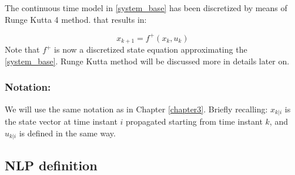 The continuous time model in \ref{system_base} has been discretized by means of Runge Kutta 4 method. that results in: 

\begin{equation*} \label{system_base_d}
	{x}_{k+1}=f^+(x_k,u_k)
\end{equation*}
Note that $f^+$ is now a discretized state equation approximating the \ref{system_base}. Runge Kutta method will be discussed more in details later on.

\subsubsection*{Notation:}
We will use the same notation as in Chapter \ref{chapter3}. Briefly recalling: ${x}_{k|i}$ is the state vector at time instant $i$ propagated starting from time instant $k$, and ${u}_{k|i}$ is defined in the same way.

\subsection{NLP definition}


